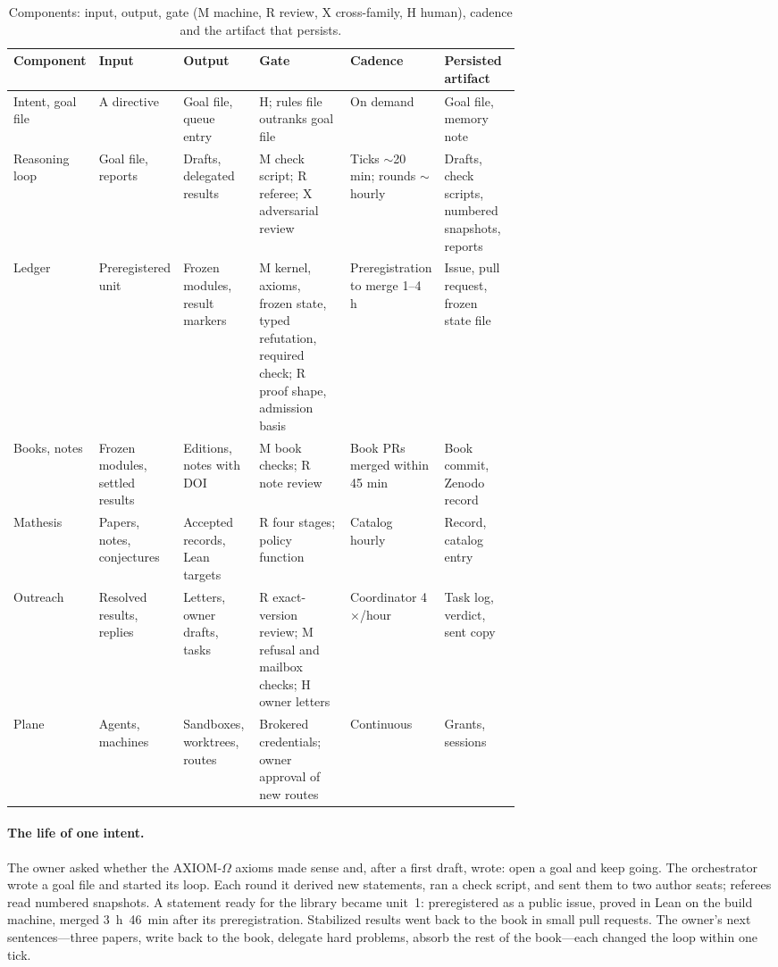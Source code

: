 \documentclass[11pt]{article}
\begin{document}
\begin{table}[htbp]
\centering\scriptsize
\caption{Components: input, output, gate (M machine, R review, X cross-family,
H human), cadence and the artifact that persists.}
\label{tab:overview}
\begin{tabularx}{\linewidth}{@{}>{\raggedright\arraybackslash}p{0.1\linewidth}>{\raggedright\arraybackslash}p{0.13\linewidth}>{\raggedright\arraybackslash}p{0.15\linewidth}>{\raggedright\arraybackslash}X>{\raggedright\arraybackslash}p{0.13\linewidth}>{\raggedright\arraybackslash}p{0.15\linewidth}@{}}
\toprule
Component & Input & Output & Gate & Cadence & Persisted artifact \\
\midrule
Intent, goal file & A directive & Goal file, queue entry & H; rules file outranks goal file & On demand & Goal file, memory note \\
Reasoning loop & Goal file, reports & Drafts, delegated results & M check script; R referee; X adversarial review & Ticks $\sim$20 min; rounds $\sim$hourly & Drafts, check scripts, numbered snapshots, reports \\
Ledger & Preregistered unit & Frozen modules, result markers & M kernel, axioms, frozen state, typed refutation, required check; R proof shape, admission basis & Preregistration to merge 1--4 h & Issue, pull request, frozen state file \\
Books, notes & Frozen modules, settled results & Editions, notes with DOI & M book checks; R note review & Book PRs merged within 45 min & Book commit, Zenodo record \\
Mathesis & Papers, notes, conjectures & Accepted records, Lean targets & R four stages; policy function & Catalog hourly & Record, catalog entry \\
Outreach & Resolved results, replies & Letters, owner drafts, tasks & R exact-version review; M refusal and mailbox checks; H owner letters & Coordinator 4$\times$/hour & Task log, verdict, sent copy \\
Plane & Agents, machines & Sandboxes, worktrees, routes & Brokered credentials; owner approval of new routes & Continuous & Grants, sessions \\
\bottomrule
\end{tabularx}
\end{table}

\paragraph{The life of one intent.} The owner asked whether the AXIOM-$\Omega$
axioms made sense and, after a first draft, wrote: open a goal and keep
going. The orchestrator wrote a goal file and started its loop. Each round it
derived new statements, ran a check script, and sent them to two author seats;
referees read numbered snapshots. A statement ready for the library became
unit~1: preregistered as a public issue, proved in Lean on the build machine,
merged 3~h~46~min after its preregistration. Stabilized results went back to
the book in small pull requests. The owner's next sentences---three papers, write
back to the book, delegate hard problems, absorb the rest of the book---each
changed the loop within one tick.
\end{document}
